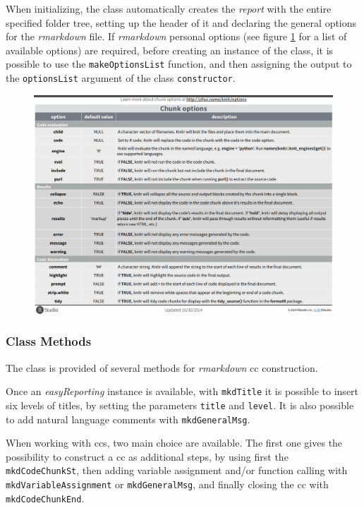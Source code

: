 When initializing, the class automatically creates the \textit{report} with the entire specified folder tree, setting up the header of it and declaring the general options for the \textit{rmarkdown} file.
If \textit{rmarkdown} personal options (see figure \ref{fig:knitropts} for a list of available options) are required, before creating an instance of the class, it is possible to use the \lstinline!makeOptionsList! function, and then assigning the output to the \lstinline!optionsList! argument of the class \lstinline!constructor!.

\begin{figure}[H]
\centering
\includegraphics[width=\textwidth, keepaspectratio]{img/rr/knitropts.png}
\caption[knitr options]{}
\label{fig:knitropts}
\end{figure}



\subsubsection{Class Methods}

The class is provided of several methods for \textit{rmarkdown} \gls{cc} construction.

Once an \textit{easyReporting} instance is available, with \lstinline!mkdTitle! it is possible to insert six levels of titles, by setting the parameters \lstinline!title! and \lstinline!level!.
It is also possible to add natural language comments with \lstinline!mkdGeneralMsg!.

When working with \glspl{cc}, two main choice are available.
The first one gives the possibility to construct a \gls{cc} as additional steps, by using first the \lstinline!mkdCodeChunkSt!, then adding variable assignment and/or function calling with \lstinline!mkdVariableAssignment! or \lstinline!mkdGeneralMsg!, and finally closing the \gls{cc} with \lstinline!mkdCodeChunkEnd!.


